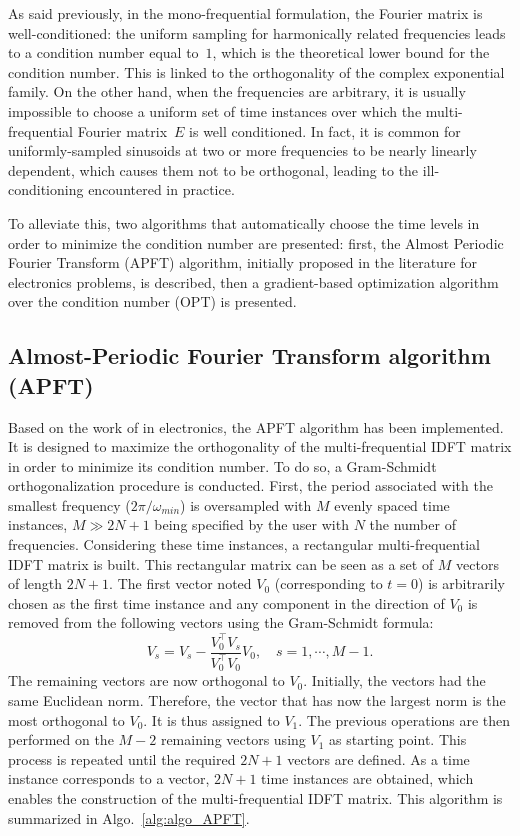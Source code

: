 
As said previously, in the mono-frequential formulation, 
the Fourier matrix is well-conditioned: the
uniform sampling for harmonically related frequencies leads to a
condition number equal to~$1$, which is the theoretical lower bound
for the condition number.  This is linked to the orthogonality of the
complex exponential family.  On the other hand, when the frequencies are arbitrary, it is usually
impossible to choose a uniform set of time instances over which the
multi-frequential Fourier matrix~$E$ is well conditioned. In fact, it is common for uniformly-sampled
sinusoids at two or more frequencies to be nearly linearly dependent,
which causes them not to be orthogonal, leading to the
ill-conditioning encountered in practice.

To alleviate this, two algorithms that automatically choose the time levels in order to
minimize the condition number are presented: first, the Almost
Periodic Fourier Transform (APFT) algorithm, initially proposed in the
 literature for electronics problems, is described, then a gradient-based
optimization algorithm over the condition number (OPT) is presented.

\subsection{Almost-Periodic Fourier Transform algorithm (APFT)}
\label{sec:apft_algorithm}
Based on the work of \citet{Kundert1988} in
electronics, the APFT
algorithm has been implemented. It is designed
to maximize the orthogonality of the multi-frequential
IDFT matrix in order to minimize its condition number. To do so, a
Gram-Schmidt orthogonalization procedure is conducted.  First, the period 
associated with the smallest frequency ($2 \pi / \omega_{min}$) 
is oversampled with $M$ evenly spaced time
instances, $M\gg2N+1$ being specified by the user with $N$ the number of
frequencies. Considering these time instances, a rectangular
multi-frequential IDFT matrix is built. This rectangular matrix can be seen
as a set of $M$ vectors of length $2N+1$.
The first vector noted $V_0$ (corresponding
to $t=0$) is arbitrarily chosen as the first time instance and any
component in the direction of $V_0$ is removed from the following
vectors using the Gram-Schmidt formula:
\begin{equation}
   V_s = V_s - \frac{V_0^\top V_s}{V_0^\top V_0} V_0, \quad s=1,\cdots,M-1.
   \label{GramSchmidtAlgo}
\end{equation}
The remaining vectors are now orthogonal to $V_0$. 
Initially, the vectors had the same Euclidean norm.
Therefore, the vector that has now the largest norm is
the most orthogonal to $V_0$.
It is thus assigned to $V_1$. The previous
operations are then performed on the $M-2$ remaining vectors using $V_1$
as starting point. This process is repeated until the required $2N+1$ vectors
are defined. As a time instance corresponds to a vector, $2N+1$ time instances are obtained, 
which enables the construction of the multi-frequential
IDFT matrix. This algorithm is summarized in
Algo.~\ref{alg:algo_APFT}.

